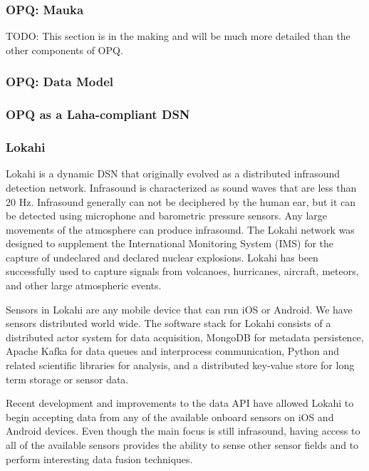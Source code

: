 \subsubsection{OPQ: Mauka}

TODO: This section is in the making and will be much more detailed than the other components of OPQ.

\subsubsection{OPQ: Data Model}

\subsubsection{OPQ as a Laha-compliant DSN}

\subsubsection{Lokahi}
Lokahi is a dynamic DSN that originally evolved as a distributed infrasound detection network. Infrasound is characterized as sound waves that are less than 20 Hz. Infrasound generally can not be deciphered by the human ear, but it can be detected using microphone and barometric pressure sensors. Any large movements of the atmosphere can produce infrasound. The Lokahi network was designed to supplement the International Monitoring System (IMS) for the capture  of undeclared and declared nuclear explosions. Lokahi has been successfully used to capture signals from volcanoes, hurricanes, aircraft, meteors, and other large atmospheric events. 

Sensors in Lokahi are any mobile device that can run iOS or Android. We have sensors distributed world wide. The software stack for Lokahi consists of a distributed actor system for data acquisition, MongoDB for metadata persistence, Apache Kafka for data queues and interprocess communication, Python and related scientific libraries for analysis, and a distributed key-value store for long term storage or sensor data.

Recent development and improvements to the data API have allowed Lokahi to begin accepting data from any of the available onboard sensors on iOS and Android devices. Even though the main focus is still infrasound, having access to all of the available sensors provides the ability to sense other sensor fields and to perform interesting data fusion techniques. 

